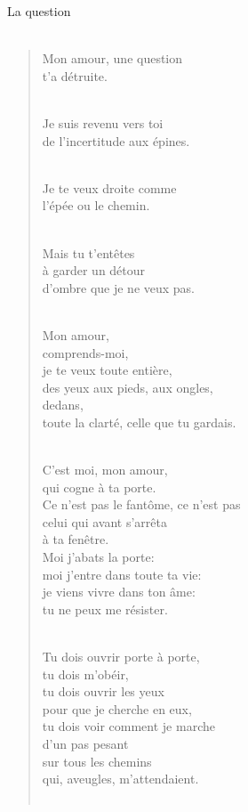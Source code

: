 \documentclass[11pt,a4paper]{book}
\begin{document}
\newpage

{\huge La question} \\ \\

\begin{verse}
Mon amour, une question \\
t'a détruite. \\ \

Je suis revenu vers toi \\
de l'incertitude aux épines. \\ \

Je te veux droite comme \\
l'épée ou le chemin. \\ \

Mais tu t'entêtes \\
à garder un détour \\
d'ombre que je ne veux pas. \\ \

Mon amour, \\
comprends-moi, \\
je te veux toute entière, \\
des yeux aux pieds, aux ongles, \\
dedans, \\
toute la clarté, celle que tu gardais. \\ \

C'est moi, mon amour, \\
qui cogne à ta porte. \\
Ce n'est pas le fantôme, ce n'est pas \\
celui qui avant s'arrêta \\
à ta fenêtre. \\
Moi j'abats la porte: \\
moi j'entre dans toute ta vie: \\
je viens vivre dans ton âme: \\
tu ne peux me résister. \\ \

Tu dois ouvrir porte à porte, \\
tu dois m'obéir, \\
tu dois ouvrir les yeux \\
pour que je cherche en eux, \\
tu dois voir comment je marche \\
d'un pas pesant \\
sur tous les chemins \\
qui, aveugles, m'attendaient. \\ \


\end{verse}
\end{document}
